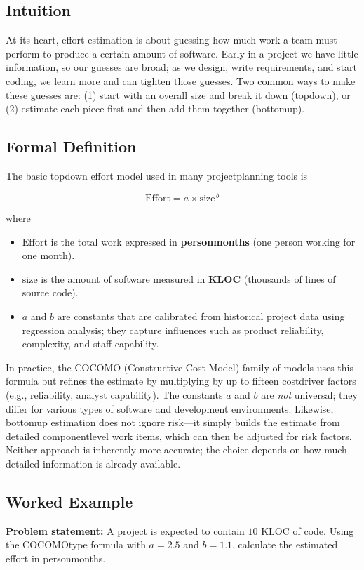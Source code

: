 \documentclass[12pt, a4paper]{article}
\begin{document}
\subsection{Intuition}
At its heart, effort estimation is about guessing how much work a team must perform to produce a certain amount of software.  Early in a project we have little information, so our guesses are broad; as we design, write requirements, and start coding, we learn more and can tighten those guesses.  Two common ways to make these guesses are: (1) start with an overall size and break it down (topdown), or (2) estimate each piece first and then add them together (bottomup).

\subsection{Formal Definition}
The basic topdown effort model used in many projectplanning tools is  

\[
\mbox{Effort}=a\times \mbox{size}^{\,b}
\]

where  

\begin{itemize}
\item \(\mbox{Effort}\) is the total work expressed in \textbf{personmonths} (one person working for one month).
\item \(\mbox{size}\) is the amount of software measured in \textbf{KLOC} (thousands of lines of source code).
\item \(a\) and \(b\) are constants that are calibrated from historical project data using regression analysis; they capture influences such as product reliability, complexity, and staff capability.
\end{itemize}

In practice, the COCOMO (Constructive Cost Model) family of models uses this formula but refines the estimate by multiplying by up to fifteen costdriver factors (e.g., reliability, analyst capability).  The constants \(a\) and \(b\) are \textit{not} universal; they differ for various types of software and development environments.  Likewise, bottomup estimation does not ignore risk---it simply builds the estimate from detailed componentlevel work items, which can then be adjusted for risk factors.  Neither approach is inherently more accurate; the choice depends on how much detailed information is already available.

\subsection{Worked Example}
\textbf{Problem statement:}  A project is expected to contain \(10\) KLOC of code.  Using the COCOMOtype formula with \(a = 2.5\) and \(b = 1.1\), calculate the estimated effort in personmonths.
\end{document}
